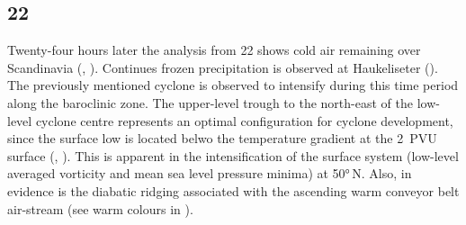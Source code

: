 \subsection*{\SI{22}{\dec}}
Twenty-four hours later the analysis from \SI{22}{\dec} shows cold air remaining over Scandinavia (, ). Continues frozen precipitation is observed at Haukeliseter ().
\\
The previously mentioned cyclone is observed to intensify during this time period along the baroclinic zone. The upper-level trough to the north-east of the low-level cyclone centre represents an optimal configuration for cyclone development, since the surface low is located belwo the temperature gradient at the \SI{2}{PVU} surface (, ). This is apparent in the intensification of the surface system (low-level averaged vorticity and mean sea level pressure minima) at \ang{50}{\,N}.  Also, in evidence is the diabatic ridging associated with the ascending warm conveyor belt air-stream (see warm colours in ).
